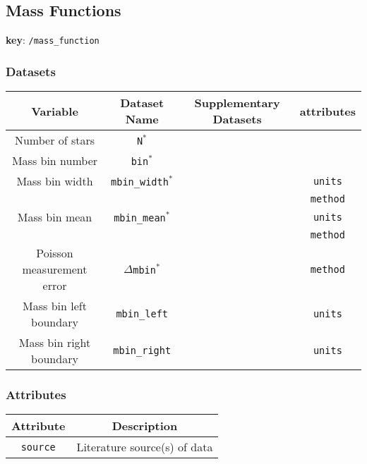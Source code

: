 \subsection{Mass Functions}

\textbf{key}: \texttt{/mass\_function}

\subsubsection{Datasets}

\begin{center}
\begin{table}[H]
\begin{tabular}{ | c | c | c | c | }
    \hline
    Variable & Dataset Name & Supplementary Datasets &  attributes \\
    \hline\hline
    Number of stars & \texttt{N\(^*\)} & & \\
    \hline
    Mass bin number & \texttt{bin\(^*\)} & & \\
    \hline
    Mass bin width & \texttt{mbin\_width\(^*\)} & &
    \texttt{units}\\ &&& \texttt{method} \\
    \hline
    Mass bin mean & \texttt{mbin\_mean\(^*\)} & &
    \texttt{units}\\ &&& \texttt{method} \\
    \hline
    Poisson measurement error & \texttt{\(\Delta\)mbin\(^*\)} & & \texttt{method} \\
    \hline
    Mass bin left boundary & \texttt{mbin\_left} & & \texttt{units}\\
    \hline
    Mass bin right boundary & \texttt{mbin\_right} & & \texttt{units}\\
    \hline
\end{tabular}
\end{table}
\end{center}

\subsubsection{Attributes}


\begin{center}
\begin{table}[H]
\begin{tabular}{ | c | c | }
    \hline
    Attribute & Description \\
    \hline\hline
    \texttt{source} & Literature source(s) of data \\
    \hline
\end{tabular}
\end{table}
\end{center}
